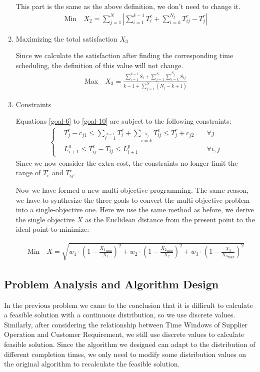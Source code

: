 \documentclass{llncs}
\begin{document}
\begin{enumerate}
    This part is the same as the above definition, we don't need to change it.
    \begin{align}\label{goal-9}
        \text{Min} \quad X_2=\sum_{j=1}^N\left|\sum_{i=1}^{k-1}T_i^e+\sum_{i=k}^{N_j}T_{ij}^e-T_j^r\right|
    \end{align}

    \item Maximizing the total satisfaction $X_3$

    Since we calculate the satisfaction after finding the corresponding time scheduling, the definition of this value will not change.
    \begin{align}\label{goal-10}
        \text{Max}\quad X_3=\frac{\sum_{i=1}^{k-1}S_i+\sum_{j=1}^{N}\sum_{i=k}^{N_j}S_{ij}}{k-1+\sum_{j=1}^N(N_j-k+1)}
    \end{align}

    \item Constraints

    Equations \eqref{goal-6} to \eqref{goal-10} are subject to the following constraints:
    \begin{align}
       \left\{
       \begin{matrix}
           &T_j^r-c_{j1}\leq\sum\limits_{i=1}\limits^{k-1}T_i^e+\sum\limits_{i=k}\limits^{N_j}T_{ij}^e\leq T_j^r+c_{j2} &\quad\forall j\\
           &L_{i+1}^a\leq T_{ij}^e-T_{ij}\leq L_{i+1}^p &\quad \forall i,j
       \end{matrix}
       \right.
    \end{align}
    Since we now consider the extra cost, the constraints no longer limit the range of $T_i^e$ and $T_{ij}^e$.

    Now we have formed a new multi-objective programming. The same reason, we have to synthesize the three goals to convert the multi-objective problem into a single-objective one. Here we use the same method as before, we derive the single objective $X$ as the Euclidean distance from the present point to the ideal point to minimize:

    \begin{align}
        \text{Min}\quad X=\sqrt{w_1\cdot(1-\frac{{X_1}_{\min}}{X_1})^2+w_2\cdot(1-\frac{{X_2}_{\min}}{X_2})^2+w_3\cdot(1-\frac{{X_3}}{{X_3}_{\max}})^2}
    \end{align}
    \end{enumerate}
\subsection{Problem Analysis and Algorithm Design}
In the previous problem we came to the conclusion that it is difficult to calculate a feasible solution with a continuous distribution, so we use discrete values. Similarly, after considering the relationship between Time Windows of Supplier Operation and Customer Requirement, we still use discrete values to calculate feasible solution. Since the algorithm we designed can adapt to the distribution of different completion times, we only need to modify some distribution values on the original algorithm to recalculate the feasible solution.
\end{document}
